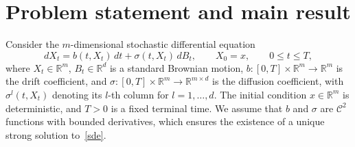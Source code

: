 \documentclass[]{interact}
\newcommand{\1}{\mathbf{1}}
\theoremstyle{plain}%
\theoremstyle{definition}
\theoremstyle{remark}
\numberwithin{equation}{section}
\begin{document}
\section{Problem statement and main result}
\label{sec:problem-statement}
Consider the \(m\)-dimensional stochastic differential equation
\begin{equation}
dX_t = b(t, X_t)\,dt + \sigma(t, X_t)\,dB_t, 
\qquad X_0 = x, 
\qquad 0 \le t \le T,
\label{sde}
\end{equation}
where \(X_t \in \mathbb{R}^m\), \(B_t \in \mathbb{R}^d\) is a standard Brownian motion, 
\(b : [0,T] \times \mathbb{R}^m \to \mathbb{R}^m\) is the drift coefficient, and 
\(\sigma : [0,T] \times \mathbb{R}^m \to \mathbb{R}^{m \times d}\) is the diffusion coefficient, 
with \(\sigma^{l}(t,X_t)\) denoting its \(l\)-th column for \(l = 1,\ldots,d\). 
The initial condition \(x \in \mathbb{R}^m\) is deterministic, and \(T > 0\) is a fixed terminal time. 
We assume that \(b\) and \(\sigma\) are \(\mathcal{C}^{2}\) functions with bounded derivatives, which ensures the existence of a unique strong solution to~\eqref{sde}. 

\end{document}
